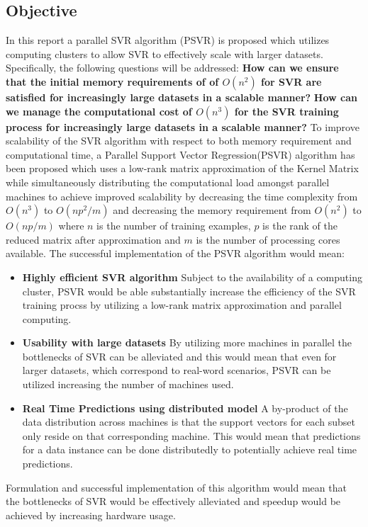 \documentclass[12pt]{article}
\begin{document}
\subsection{Objective}
In this report a parallel SVR algorithm (PSVR) is proposed which utilizes computing clusters to allow SVR to effectively scale with larger datasets.
Specifically, the following questions will be addressed:
\newline\newline
\setlength{\leftskip}{3cm}
{\bf How can we ensure that the initial memory requirements of of $O(n^2)$ for SVR are satisfied for increasingly large datasets in a scalable manner?}
\newline\newline
{\bf How can we manage the computational cost of $O(n^3)$ for the SVR training process for increasingly large datasets in a scalable manner?}
\setlength{\leftskip}{0pt}
\newline\newline
To improve scalability of the SVR algorithm with respect to both memory requirement and computational time, a Parallel Support Vector Regression(PSVR) algorithm has been proposed which uses a low-rank matrix approximation of the Kernel Matrix while simultaneously distributing the computational load amongst parallel machines to achieve improved scalability by decreasing the time complexity from $O(n^3)$ to $O(np^2/m)$ and decreasing the memory requirement from $O(n^2)$ to $O(np/m)$ where $n$ is the number of training examples, $p$ is the rank of the reduced matrix after approximation and $m$ is the number of processing cores available.
\newline\newline
The successful implementation of the PSVR algorithm would mean:
\begin{itemize}
\item {\bf Highly efficient SVR algorithm} 
Subject to the availability of a computing cluster, PSVR would be able substantially increase the efficiency of the SVR training procss by utilizing a low-rank matrix approximation and parallel computing.
\item {\bf Usability with large datasets} By utilizing more machines in parallel the bottlenecks of SVR can be alleviated and this would mean that even for larger datasets, which correspond to real-word scenarios, PSVR can be utilized increasing the number of machines used.
\item {\bf Real Time Predictions using distributed model} A by-product of the data distribution across machines is that the support vectors for each subset only reside on that corresponding machine. This would mean that predictions for a data instance can be done distributedly to potentially achieve real time predictions.
\end{itemize}
Formulation and successful implementation of this algorithm would mean that the bottlenecks of SVR would be effectively alleviated and speedup would be achieved by increasing hardware usage.
\end{document}
